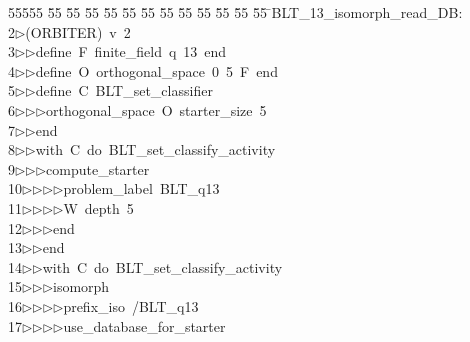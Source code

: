 %
%
\begin{tabbing}
55555 \= 55 \= 55 \= 55 \= 55 \= 55 \= 55 \= 55 \= 55 \= 55 \= 55 \= 55 \= 55 \= \>BLT\_13\_isomorph\_read\_DB:\\[0pt]
2\>$\triangleright$\>(ORBITER)\ v\ 2\ \\[0pt]
3\>$\triangleright$\>$\triangleright$\>define\ F\ finite\_field\ q\ 13\ end\ \\[0pt]
4\>$\triangleright$\>$\triangleright$\>define\ O\ orthogonal\_space\ 0\ 5\ F\ end\ \\[0pt]
5\>$\triangleright$\>$\triangleright$\>define\ C\ BLT\_set\_classifier\ \\[0pt]
6\>$\triangleright$\>$\triangleright$\>$\triangleright$\>orthogonal\_space\ O\ starter\_size\ 5\ \\[0pt]
7\>$\triangleright$\>$\triangleright$\>end\ \\[0pt]
8\>$\triangleright$\>$\triangleright$\>with\ C\ do\ BLT\_set\_classify\_activity\ \\[0pt]
9\>$\triangleright$\>$\triangleright$\>$\triangleright$\>compute\_starter\ \\[0pt]
10\>$\triangleright$\>$\triangleright$\>$\triangleright$\>$\triangleright$\>problem\_label\ BLT\_q13\ \\[0pt]
11\>$\triangleright$\>$\triangleright$\>$\triangleright$\>$\triangleright$\>W\ depth\ 5\ \\[0pt]
12\>$\triangleright$\>$\triangleright$\>$\triangleright$\>end\ \\[0pt]
13\>$\triangleright$\>$\triangleright$\>end\ \\[0pt]
14\>$\triangleright$\>$\triangleright$\>with\ C\ do\ BLT\_set\_classify\_activity\ \\[0pt]
15\>$\triangleright$\>$\triangleright$\>$\triangleright$\>isomorph\ \\[0pt]
16\>$\triangleright$\>$\triangleright$\>$\triangleright$\>$\triangleright$\>prefix\_iso\ /BLT\_q13\ \\[0pt]
17\>$\triangleright$\>$\triangleright$\>$\triangleright$\>$\triangleright$\>use\_database\_for\_starter\ \\[0pt]

\end{tabbing}
